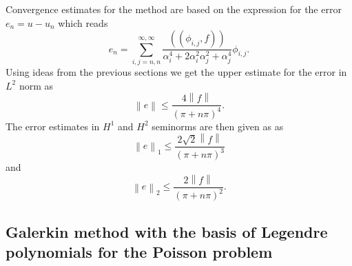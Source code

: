 \documentclass[a4paper,10pt]{article}
\newcommand{\norm}[1]{\ensuremath{\left\|#1\right\|}}
\newcommand{\Inner}[2]{\ensuremath{\left(\left(#1, #2\right)\right)}}
\begin{document}
  Convergence estimates for the method are based on the expression for the error
  $e_n=u-u_n$ which reads
  \[
    e_n = \sum\limits_{i, j = n, n}^{\infty, \infty} \frac{\Inner{\phi_{i,
    j}}{f}}{\alpha_i^4 + 2\alpha_i^2\alpha_j^2 + \alpha_j^4}\phi_{i, j}.
  \]
  Using ideas from the previous sections we get the upper estimate for the error
  in $L^2$ norm
  as
  \[
    \norm{e} \leq \frac{4\norm{f}}{\left(\pi + n\pi \right)^4}.
  \]
  The error estimates in $H^1$ and $H^2$ seminorms are then given as 
  as
  \[
    \norm{e}_1 \leq \frac{2\sqrt{2}\norm{f}}{\left(\pi + n\pi \right)^3}
  \]
  and
  \[
    \norm{e}_2 \leq \frac{2\norm{f}}{\left(\pi + n\pi \right)^2}.
  \]
  \subsection{Galerkin method with the basis of Legendre polynomials for the
  Poisson problem}

 
\end{document}
